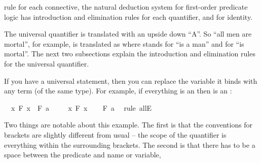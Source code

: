 \begin{isabellebody}
\begin{isamarkuptext}
rule for each connective, the natural deduction system for first-order predicate logic has introduction and elimination
rules for each quantifier, and for identity.%
\end{isamarkuptext}\isamarkuptrue%
%
\isadelimdocument
%
\endisadelimdocument
%
\isatagdocument
%
\isamarkuptrue%
%
\endisatagdocument
{\isafolddocument}%
%
\isadelimdocument
%
\endisadelimdocument
%
\begin{isamarkuptext}%
The universal quantifier is translated with an upside down ``A''. So ``all men are mortal'',
for example, is translated as  where  stands for ``is a man''
and  for ``is mortal''. The next two subsections explain the introduction and elimination
rules for the universal quantifier.%
\end{isamarkuptext}\isamarkuptrue%
%
\isadelimdocument
%
\endisadelimdocument
%
\isatagdocument
%
\isamarkuptrue%
%
\endisatagdocument
{\isafolddocument}%
%
\isadelimdocument
%
\endisadelimdocument
%
\begin{isamarkuptext}%
If you have a universal statement, then you can replace the variable it binds with any term 
(of the same type). For example, if everything is an  then  is an :%
\end{isamarkuptext}\isamarkuptrue%
\isamarkupfalse%
\ {\isachardoublequoteopen}{\isacharparenleft}{\isasymforall}\ x{\isachardot}\ F\ x{\isacharparenright}\ {\isasymlongrightarrow}\ F\ a{\isachardoublequoteclose}\isanewline
%
\isadelimproof
%
\endisadelimproof
%
\isatagproof
{}\isamarkupfalse%
\isanewline
\ \ \isamarkupfalse%
\ {\isachardoublequoteopen}{\isasymforall}\ x{\isachardot}\ F\ x{\isachardoublequoteclose}\isanewline
\ \ \isamarkupfalse%
\ {\isachardoublequoteopen}F\ a{\isachardoublequoteclose}\ \isamarkupfalse%
\ {\isacharparenleft}rule\ allE{\isacharparenright}\isanewline
{}\isamarkupfalse%
%
\endisatagproof
{\isafoldproof}%
%
\isadelimproof
%
\endisadelimproof
%
\begin{isamarkuptext}%
Two things are notable about this example. The first is that the conventions for brackets are 
slightly different from usual -- the scope of the quantifier is everything within the surrounding 
brackets. The second is that there has to be a space between the predicate and name or variable,

\end{isamarkuptext}
\end{isabellebody}
